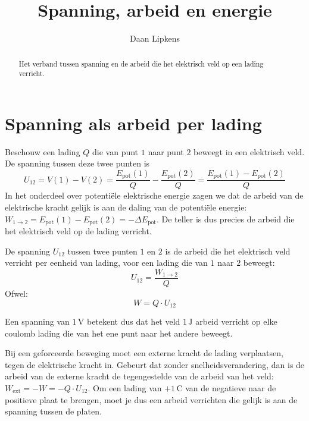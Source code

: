 \documentclass{ximera}
\title{Spanning, arbeid en energie}
\author{Daan Lipkens}
\begin{document}
\begin{abstract}
    Het verband tussen spanning en de arbeid die het elektrisch veld op een lading verricht.
\end{abstract}
\maketitle

\section{Spanning als arbeid per lading}
Beschouw een lading $Q$ die van punt $1$ naar punt $2$ beweegt in een elektrisch veld. De spanning tussen deze twee punten is
\[
    U_{12} = V(1) - V(2) = \frac{E_{\text{pot}}(1)}{Q} - \frac{E_{\text{pot}}(2)}{Q} = \frac{E_{\text{pot}}(1) - E_{\text{pot}}(2)}{Q}
\]
In het onderdeel over potentiële elektrische energie zagen we dat de arbeid van de elektrische kracht gelijk is aan de daling van de potentiële energie: $W_{1 \to 2} = E_{\text{pot}}(1) - E_{\text{pot}}(2) = -\Delta E_{\text{pot}}$. De teller is dus precies de arbeid die het elektrisch veld op de lading verricht.

\begin{proposition}[foldable=true,title={Betekenis van de spanning}]\nl
De spanning $U_{12}$ tussen twee punten $1$ en $2$ is de arbeid die het elektrisch veld verricht per eenheid van lading, voor een lading die van $1$ naar $2$ beweegt:
\begin{equation}\label{eq:spanning_energie}
    U_{12} = \frac{W_{1 \to 2}}{Q}
\end{equation}
Ofwel:
\begin{equation}\label{eq:arbeid_spanning}
    W = Q \cdot U_{12}
\end{equation}
\end{proposition}

Een spanning van $1 \, \mathrm{V}$ betekent dus dat het veld $1 \, \mathrm{J}$ arbeid verricht op elke coulomb lading die van het ene punt naar het andere beweegt.

\begin{remark}[expandable=true,title={Arbeid door een externe kracht}]\nl
Bij een geforceerde beweging moet een externe kracht de lading verplaatsen, tegen de elektrische kracht in. Gebeurt dat zonder snelheidsverandering, dan is de arbeid van de externe kracht de tegengestelde van de arbeid van het veld: $W_{\text{ext}} = -W = -Q \cdot U_{12}$. Om een lading van $+1 \, \mathrm{C}$ van de negatieve naar de positieve plaat te brengen, moet je dus een arbeid verrichten die gelijk is aan de spanning tussen de platen.
\end{remark}
\end{document}
